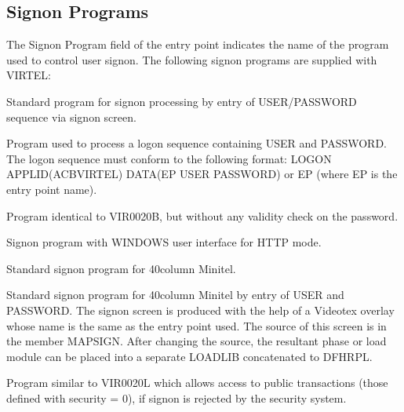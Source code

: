 \documentclass[letterpaper,10pt,english]{sphinxmanual}
\begin{document}
\ignorespaces 

\subsection{Signon Programs}
\label{\detokenize{connectivity_guide:signon-programs}}\label{\detokenize{connectivity_guide:index-110}}
\sphinxAtStartPar
The Signon Program field of the entry point indicates the name of the program used to control user sign\sphinxhyphen{}on. The following signon programs are supplied with VIRTEL:
\begin{description}
\sphinxAtStartPar
Standard program for sign\sphinxhyphen{}on processing by entry of USER/PASSWORD sequence via sign\sphinxhyphen{}on screen.

\sphinxAtStartPar
Program used to process a logon sequence containing USER and PASSWORD. The logon sequence must conform to the following format: LOGON APPLID(ACBVIRTEL) DATA(EP USER PASSWORD) or EP (where EP is the entry point name).

\sphinxAtStartPar
Program identical to VIR0020B, but without any validity check on the password.

\sphinxAtStartPar
Sign\sphinxhyphen{}on program with WINDOWS user interface for HTTP mode.

\sphinxAtStartPar
Standard sign\sphinxhyphen{}on program for 40\sphinxhyphen{}column Minitel.

\sphinxAtStartPar
Standard sign\sphinxhyphen{}on program for 40\sphinxhyphen{}column Minitel by entry of USER and PASSWORD. The sign\sphinxhyphen{}on screen is produced with the help of a Videotex overlay whose name is the same as the entry point used. The source of this screen is in the member MAPSIGN. After changing the source, the resultant phase or load module can be placed into a separate LOADLIB concatenated to DFHRPL.

\sphinxAtStartPar
Program similar to VIR0020L which allows access to public transactions (those defined with security = 0), if sign\sphinxhyphen{}on is rejected by the security system.

\end{description}
\end{document}
